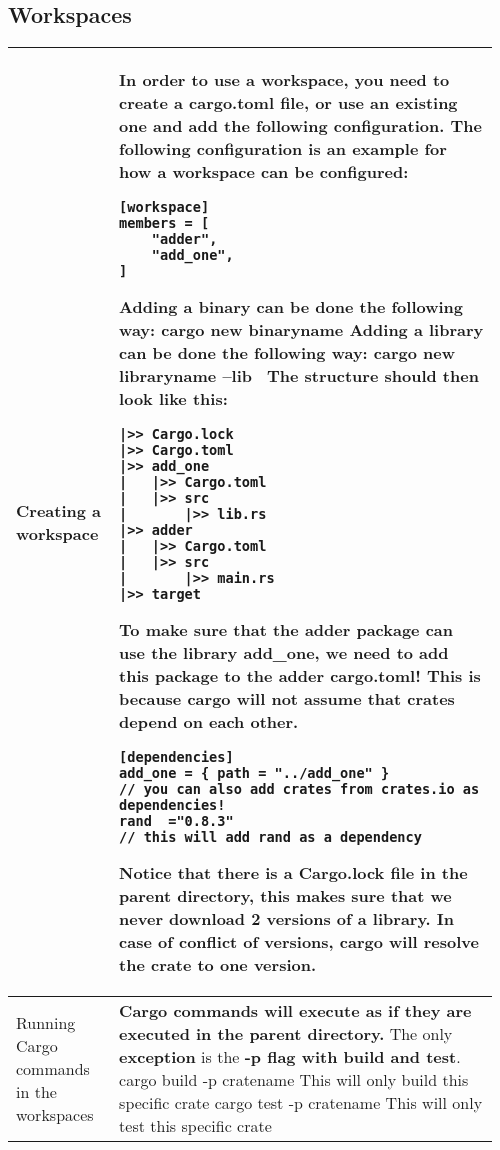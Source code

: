 \documentclass[main.tex,fontsize=8pt,paper=a4,paper=portrait,DIV=calc,]{scrartcl}
\begin{document}
\begin{table}[ht!]
\subsection{Workspaces}
\begin{tabular}{|m{0.2\linewidth}|m{0.755\linewidth}|}
\hline
Creating a workspace & 
In order to use a workspace, you need to create a cargo.toml file, or use an existing one and add the following configuration. \newline
The following configuration is an example for how a workspace can be configured:\newline
\begin{lstlisting}
[workspace]
members = [
    "adder",
    "add_one",
]
\end{lstlisting} 
Adding a binary can be done the following way:\newline
\textcolor{OliveGreen}{cargo new binaryname}\newline
Adding a library can be done the following way:\newline
\textcolor{OliveGreen}{cargo new libraryname --lib}\newline
\, \newline
The structure should then look like this: \newline
\begin{lstlisting}
|>> Cargo.lock
|>> Cargo.toml
|>> add_one
|   |>> Cargo.toml
|   |>> src
|       |>> lib.rs
|>> adder
|   |>> Cargo.toml
|   |>> src
|       |>> main.rs
|>> target
\end{lstlisting} 
To make sure that the adder package can use the library add\_one, we need to add this package to the adder cargo.toml!\newline
This is because \textbf{cargo will not assume that crates depend on each other.}\newline
\begin{lstlisting}
[dependencies]
add_one = { path = "../add_one" }
// you can also add crates from crates.io as dependencies!
rand  ="0.8.3"  
// this will add rand as a dependency
\end{lstlisting} 
\textcolor{OliveGreen}{Notice that there is a \textbf{Cargo.lock} file in the parent directory, this makes sure that we never download 2 versions of a library. In case of conflict of versions, cargo will resolve the crate to one version.}\\
\hline
Running Cargo commands in the workspaces & 
\textbf{Cargo commands will execute as if they are executed in the parent directory.}\newline
The only \textbf{exception} is the \textbf{-p flag with build and test}.\newline
\textcolor{OliveGreen}{cargo build -p cratename} This will only build this specific crate\newline
\textcolor{OliveGreen}{cargo test -p cratename} This will only test this specific crate\\
\hline
\end{tabular}
\end{table}
\end{document}
